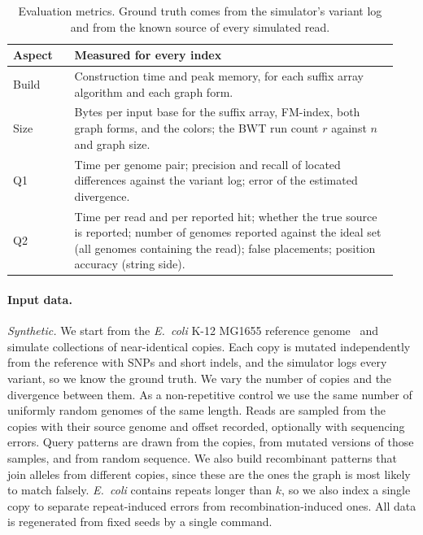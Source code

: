 \documentclass[a4paper,11pt]{article}
\theoremstyle{definition}
\begin{document}
\begin{table}[H]
\centering\small
\begin{tabular}{p{0.15\linewidth}p{0.79\linewidth}}
\hline
\textbf{Aspect} & \textbf{Measured for every index} \\ \hline
Build & Construction time and peak memory, for each suffix array algorithm and each graph form. \\
Size & Bytes per input base for the suffix array, FM-index, both graph forms, and the colors; the BWT run count $r$ against $n$ and graph size. \\
Q1 & Time per genome pair; precision and recall of located differences against the variant log; error of the estimated divergence. \\
Q2 & Time per read and per reported hit; whether the true source is reported; number of genomes reported against the ideal set (all genomes containing the read); false placements; position accuracy (string side). \\ \hline
\end{tabular}
\caption{Evaluation metrics. Ground truth comes from the simulator's variant log and from the known source of every simulated read.}
\label{tab:metrics}
\end{table}

\paragraph{Input data.} \emph{Synthetic.} We start from the \emph{E.~coli} K-12 MG1655 reference genome~\cite{doi:10.1126/science.277.5331.1453} and simulate collections of near-identical copies. Each copy is mutated independently from the reference with SNPs and short indels, and the simulator logs every variant, so we know the ground truth. We vary the number of copies and the divergence between them. As a non-repetitive control we use the same number of uniformly random genomes of the same length. Reads are sampled from the copies with their source genome and offset recorded, optionally with sequencing errors. Query patterns are drawn from the copies, from mutated versions of those samples, and from random sequence. We also build recombinant patterns that join alleles from different copies, since these are the ones the graph is most likely to match falsely. \emph{E.~coli} contains repeats longer than $k$, so we also index a single copy to separate repeat-induced errors from recombination-induced ones. All data is regenerated from fixed seeds by a single command.
\end{document}
